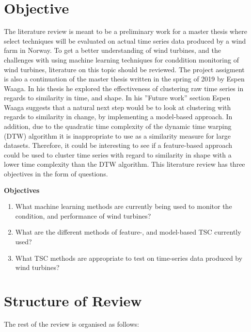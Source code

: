 \section{Objective} \label{sec:objective}

The literature review is meant to be a preliminary work for a master thesis where select techniques will be evaluated on actual time series data produced by a wind farm in Norway. 
To get a better understanding of wind turbines, and the challenges with using machine learning techniques for conddition monitoring of wind turbines, literature on this topic should be reviewed.  
The project assigment is also a continuation of the master thesis written in the spring of 2019 by Espen Waaga. 
In his thesis he explored the effectiveness of clustering raw time series in regards to similarity in time, and shape. 
In his ''Future work'' section Espen Waaga suggests that a natural next step would be to look at clustering with regards to similarity in change, by implementing a model-based approach. 
In addition, due to the quadratic time complexity of the dynamic time warping (DTW) algorithm it is inappropriate to use as a similarity measure for large datasets. 
Therefore, it could be interesting to see if a feature-based approach could be used to cluster time series with regard to similarity in shape with a lower time complexity than the DTW algorithm. 
This literature review has three objectives in the form of questions. \bigskip

\begin{tcolorbox}
    \textbf{Objectives}

    \begin{enumerate}
        \item What machine learning methods are currently being used to monitor the condition, and performance of wind turbines?
        \item What are the different methods of feature-, and model-based TSC currently used?
        \item What TSC methods are appropriate to test on time-series data produced by wind turbines? 
    \end{enumerate}
\end{tcolorbox}

\section{Structure of Review}
The rest of the review is organised as follows:

